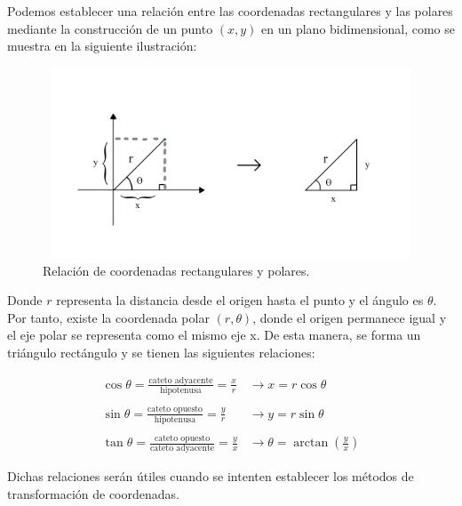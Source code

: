Podemos establecer una relación entre las coordenadas rectangulares y las polares mediante la construcción de un punto ${\left(x,y\right)}$ en un plano bidimensional, como se muestra en la siguiente ilustración:

\begin{figure}[H]
  \centering
  \includegraphics[width=11.17cm, height=5.67cm]{img/graph/relacion_r}
  \caption{Relación de coordenadas rectangulares y polares.}
  \label{relacion_de_coordenadas}
\end{figure}

Donde ${r}$ representa la distancia desde el origen hasta el punto y el ángulo es ${\theta}$. Por tanto, existe la coordenada polar ${\left(r,\theta\right)}$, donde el origen permanece igual y el eje polar se representa como el mismo eje x. De esta manera, se forma un triángulo rectángulo y se tienen las siguientes relaciones:

\begin{eqnarray*}
  \cos\theta = \frac{\text{cateto adyacente}}{\text{hipotenusa}} = \frac{x}{r} &\rightarrow x = r\cos\theta\\\\
  \sin\theta = \frac{\text{cateto opuesto}}{\text{hipotenusa}} = \frac{y}{r} &\rightarrow y = r\sin\theta\\\\
  \tan\theta = \frac{\text{cateto opuesto}}{\text{cateto adyacente}} = \frac{y}{x} &\rightarrow \theta = \arctan\left(\frac{y}{x}\right)
\end{eqnarray*}

\vspace{4mm}
Dichas relaciones serán útiles cuando se intenten establecer los métodos de transformación de coordenadas.

\cite{stewart}
